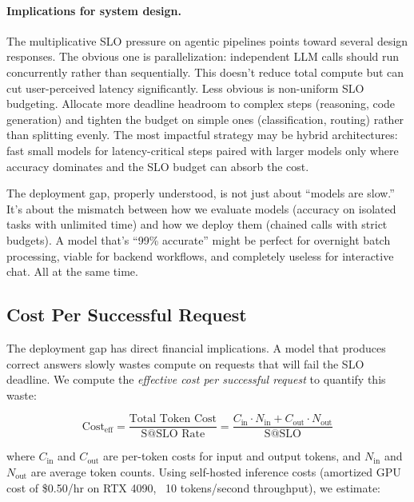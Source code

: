 \documentclass[11pt]{article}
\begin{document}
\paragraph{Implications for system design.}
The multiplicative SLO pressure on agentic pipelines points toward several design responses.  The obvious one is parallelization: independent LLM calls should run concurrently rather than sequentially.  This doesn't reduce total compute but can cut user-perceived latency significantly.  Less obvious is non-uniform SLO budgeting.  Allocate more deadline headroom to complex steps (reasoning, code generation) and tighten the budget on simple ones (classification, routing) rather than splitting evenly.  The most impactful strategy may be hybrid architectures: fast small models for latency-critical steps paired with larger models only where accuracy dominates and the SLO budget can absorb the cost.

The deployment gap, properly understood, is not just about ``models are slow.''
It's about the mismatch between how we evaluate models (accuracy on isolated tasks with unlimited time) and how we deploy them (chained calls with strict budgets).
A model that's ``99\% accurate'' might be perfect for overnight batch processing, viable for backend workflows, and completely useless for interactive chat.  All at the same time.

\subsection{Cost Per Successful Request}
\label{sec:cost-analysis}

The deployment gap has direct financial implications.  A model that produces correct answers slowly wastes compute on requests that will fail the SLO deadline.  We compute the \emph{effective cost per successful request} to quantify this waste:

\begin{equation}
\text{Cost}_{\text{eff}} = \frac{\text{Total Token Cost}}{\text{S@SLO Rate}} = \frac{C_{\text{in}} \cdot N_{\text{in}} + C_{\text{out}} \cdot N_{\text{out}}}{\text{S@SLO}}
\end{equation}

where $C_{\text{in}}$ and $C_{\text{out}}$ are per-token costs for input and output tokens, and $N_{\text{in}}$ and $N_{\text{out}}$ are average token counts.  Using self-hosted inference costs (amortized GPU cost of \$0.50/hr on RTX 4090, ~10 tokens/second throughput), we estimate:
\end{document}
